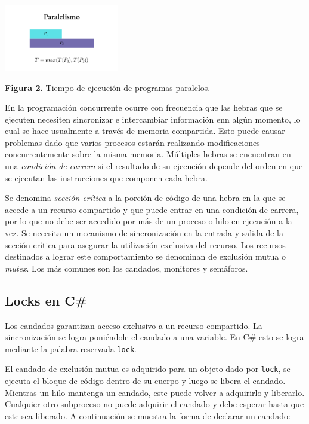 \documentclass[10pt]{article} %
\newcommand{\csl}[1]{\colorbox{backcolour}{\texttt{#1}}}
\newcommand{\imgcaption}[2]{\tiny \textbf{Figura #1.} #2.}
\begin{document}
\begin{center}
	\includegraphics[width=5cm]{paralelismo.png}
	
	\imgcaption{2}{Tiempo de ejecuci\'on de programas paralelos}
\end{center}

En la programaci\'on concurrente ocurre con frecuencia que las hebras que se ejecuten necesiten sincronizar e intercambiar informaci\'on enn alg\'un momento, lo cual se hace usualmente a trav\'es de memoria compartida. Esto puede causar problemas dado que varios procesos estar\'an realizando modificaciones concurrentemente sobre la misma memoria. M\'ultiples hebras se encuentran en una \textit{condici\'on de carrera} si el resultado de su ejecuci\'on depende del orden en que se ejecutan las instrucciones que componen cada hebra. 

Se denomina \textit{sección crítica} a la porción de código de una hebra en la que se accede a un recurso compartido y que puede entrar en una condici\'on de carrera, por lo que no debe ser accedido por más de un proceso o hilo en ejecución a la vez. Se necesita un mecanismo de sincronización en la entrada y salida de la sección crítica para asegurar la utilización exclusiva del recurso. Los recursos destinados a lograr este comportamiento se denominan de exclusi\'on mutua o \textit{mutex}. Los m\'as comunes son los candados, monitores y semáforos.

\subsection{Locks en C\#}

Los candados garantizan acceso exclusivo a un recurso compartido. La sincronizaci\'on se logra poni\'endole el candado a una variable. En C\# esto se logra mediante la palabra reservada \csl{lock}. 

El candado de exclusi\'on mutua es adquirido para un objeto dado por \csl{lock}, se ejecuta el bloque de c\'odigo dentro de su cuerpo y luego se libera el candado. Mientras un hilo mantenga un candado, este puede volver a adquirirlo y liberarlo. Cualquier otro subproceso no puede adquirir el candado y debe esperar hasta que este sea liberado. A continuaci\'on se muestra la forma de declarar un candado:
\end{document}

